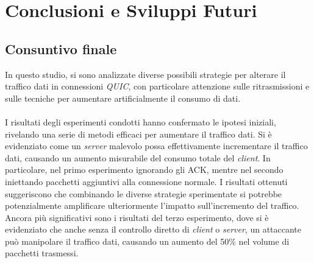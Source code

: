 \chapter{Conclusioni e Sviluppi Futuri}
\label{cap:conclusioni}

\section{Consuntivo finale}
In questo studio, si sono analizzate diverse possibili strategie per alterare il traffico dati in connessioni \emph{QUIC},
con particolare attenzione sulle ritrasmissioni e sulle tecniche per aumentare artificialmente il consumo di dati.
\\\\
I risultati degli esperimenti condotti hanno confermato le ipotesi iniziali, rivelando una serie di metodi efficaci per aumentare il traffico dati. 
Si è evidenziato come un \emph{server} malevolo possa effettivamente incrementare il traffico dati, causando un aumento misurabile del consumo totale del \emph{client}.
In particolare, nel primo esperimento ignorando gli ACK, mentre nel secondo iniettando pacchetti aggiuntivi alla connessione normale. 
I risultati ottenuti suggeriscono che combinando le diverse strategie sperimentate si
potrebbe potenzialmente amplificare ulteriormente l'impatto sull'incremento del traffico. 
Ancora più significativi sono i risultati del terzo esperimento, dove si è evidenziato che anche senza il controllo diretto di \emph{client} o \emph{server}, 
un attaccante può manipolare il traffico dati, causando un aumento del 50\% nel volume di pacchetti trasmessi.

